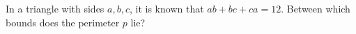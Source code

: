 In a triangle with sides $a, b, c$, it is known that $ab + bc + ca = 12$. Between which bounds does the perimeter $p$ lie?

